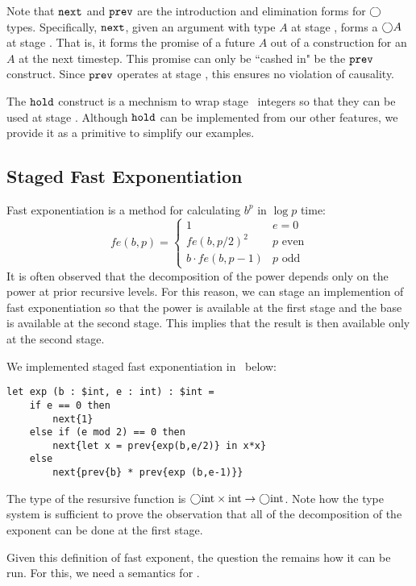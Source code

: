 Note that ${\tt next}$ and ${\tt prev}$ are the introduction and elimination forms for $\bigcirc$ types.
Specifically, ${\tt next}$, given an argument with type $A$ at stage \bbtwo, forms a $\bigcirc A$ at stage \bbone.  
That is, it forms the promise of a future $A$ out of a construction for an $A$ at the next timestep.
This promise can only be ``cashed in" be the ${\tt prev}$ construct.  
Since ${\tt prev}$ operates at stage \bbtwo, this ensures no violation of causality.

The ${\tt hold}$ construct is a mechnism to wrap stage \bbone~integers so that they can be used at stage \bbtwo.  
Although ${\tt hold}$ can be implemented from our other features, 
we provide it as a primitive to simplify our examples. 

\subsection {Staged Fast Exponentiation}

Fast exponentiation is a method for calculating $b^p$ in $\log p$ time:
\[
	\mathit{fe}(b,p) = \left \{ \begin{array}{ll} 
		1 &  e = 0 \\ 
		\mathit{fe}(b,p/2)^2 & p \text{ even} \\ 
		b \cdot \mathit{fe}(b,p-1) & p \text{ odd} \end{array}
	\right .
\]
It is often observed that the decomposition of the power depends only on the power at prior recursive levels.
For this reason, we can stage an implemention of fast exponentiation so that the power is available at the first stage and the base is available at the second stage.
This implies that the result is then available only at the second stage.

We implemented staged fast exponentiation in \lang~below:

\begin{lstlisting} 
let exp (b : $int, e : int) : $int =
	if e == 0 then
		next{1}
	else if (e mod 2) == 0 then
		next{let x = prev{exp(b,e/2)} in x*x}
	else
		next{prev{b} * prev{exp (b,e-1)}}		
\end{lstlisting}

The type of the resursive function is $\bigcirc{\rm int} \times {\rm int} \to \bigcirc{\rm int}$.
Note how the type system is sufficient to prove the observation that all of the decomposition of the exponent can be done at the first stage.

Given this definition of fast exponent, the question the remains how it can be run.  For this, we need a semantics for \lang.


